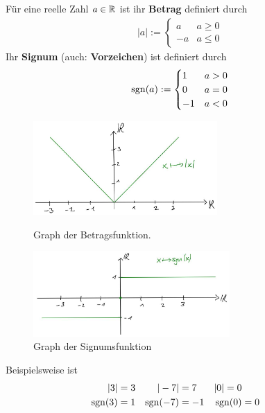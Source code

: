 \begin{defin}  
    Für eine reelle Zahl $a\in \mathbb R$ ist ihr \textbf{Betrag} definiert durch
    \begin{align*}
        |a|:= \begin{cases}
            a&a\ge 0\\
            -a&a \le 0
        \end{cases}
    \end{align*}
    Ihr \textbf{Signum} (auch: \textbf{Vorzeichen}) ist definiert durch
    \begin{align*}
        \operatorname{sgn}(a) := \begin{cases}
            1 & a>0 \\
            0 & a=0 \\
            -1 & a<0
        \end{cases}
    \end{align*} 
    \begin{figure}[ht]
    \begin{minipage}{.48\textwidth}
        \includegraphics[width=7cm]{./_img/Betrag.jpeg}
        \centering \caption{Graph der Betragsfunktion.}
    \end{minipage}
    \quad
    \begin{minipage}{.48\textwidth}
        \includegraphics[width=7.5cm]{./_img/Signum.jpeg}
        \centering \caption{Graph der Signumsfunktion}
    \end{minipage}
    \end{figure}
\end{defin}


\begin{bsp}
    Beispielsweise ist
    \begin{align*}
        \vert 3\vert &= 3 & \vert -7\vert &=7 & \vert 0\vert=0 \\
        \operatorname{sgn}(3) & = 1 & \operatorname{sgn}(-7) & = -1 & \operatorname{sgn}(0) & = 0
    \end{align*}
\end{bsp}


